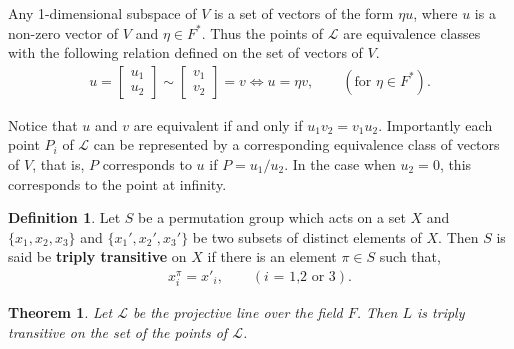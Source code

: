 \documentclass[a4paper , 11pt]{book}
\newtheorem{theorem}{Theorem}[chapter]
\theoremstyle{definition}
\newtheorem*{definition-non}{Definition}
\theoremstyle{remark}
\begin{document}
Any 1-dimensional subspace of $V$ is a set of vectors of the form $\eta u$, where $u$ is a non-zero vector of $V$ and $\eta \in F^*$. Thus the points of $\mathscr{L}$ are equivalence classes with the following relation defined on the set of vectors of $V$.
\begin{align*} u = \begin{bmatrix} u_1 \\ u_2 \end{bmatrix} \sim \begin{bmatrix} v_1 \\ v_2 \end{bmatrix} = v \iff u = \eta v, \qquad (\text{for $\eta \in F^*$}).
\end{align*}

Notice that $u$ and $v$ are equivalent if and only if $u_1 v_2 = v_1 u_2$. Importantly each point $P_i$ of $\mathscr{L}$ can be represented by a corresponding equivalence class of vectors of $V$, that is, $P$ corresponds to $u$ if $P = u_1 / u_2$. In the case when $u_2 = 0$, this corresponds to the point at infinity.

\begin{definition-non} Let $S$ be a permutation group which acts on a set $X$ and $\{ x_1, x_2, x_3 \}$ and $\{ x_1', x_2', x_3' \}$ be two subsets of distinct elements of $X$. Then $S$ is said be \textbf{triply transitive} on $X$ if there is an element $\pi \in S$ such that,
\begin{align*} x^{\pi}_i = x'_i, \qquad(\text{$i$ = 1,2 or 3}).
\end{align*} 
\end{definition-non}

\begin{theorem} \label{6.6}
Let $\mathscr{L}$ be the projective line over the field $F$. Then $L$ is triply transitive on the set of the points of $\mathscr{L}$. \vspace{3mm}
\end{theorem}
\end{document}
